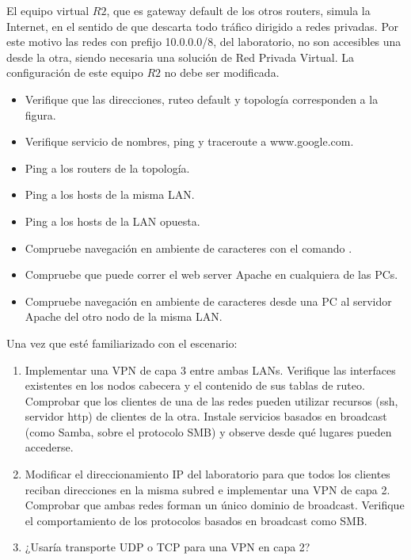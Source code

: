 
El equipo virtual $R2$, que es gateway default de los otros routers, simula la Internet, en el sentido de que descarta todo tráfico dirigido a redes privadas. Por este motivo las redes con prefijo 10.0.0.0/8, del laboratorio, no son accesibles una desde la otra, siendo necesaria una solución de Red Privada Virtual. La configuración de este equipo $R2$ no debe ser modificada.

\begin{itemize}
	\item Verifique que las direcciones, ruteo default y topología corresponden a la figura.
	\item Verifique servicio de nombres, ping y traceroute a www.google.com.
	\item Ping a los routers de la topología.
	\item Ping a los hosts de la misma LAN.
	\item Ping a los hosts de la LAN opuesta. 
	\item Compruebe navegación en ambiente de caracteres con el comando .
	\item Compruebe que puede correr el web server Apache en cualquiera de las PCs. 
	\item Compruebe navegación en ambiente de caracteres desde una PC al servidor Apache del otro nodo de la misma LAN.
\end{itemize}

Una vez que esté familiarizado con el escenario:
\begin{enumerate}
	\item Implementar una VPN de capa 3 entre ambas LANs. Verifique las interfaces existentes en los nodos cabecera y el contenido de sus tablas de ruteo. Comprobar que los  clientes de una de las redes pueden utilizar recursos (ssh, servidor http) de clientes de la otra. Instale servicios basados en broadcast (como Samba, sobre el protocolo SMB) y observe desde qué lugares pueden accederse.
	\item Modificar el direccionamiento IP del laboratorio para que todos los clientes reciban direcciones en la misma subred e implementar una VPN de capa 2. Comprobar que ambas redes forman un único dominio de broadcast. Verifique el comportamiento de los protocolos basados en broadcast como SMB. 
	\item ¿Usaría transporte UDP o TCP para una VPN en capa 2?
\end{enumerate}


